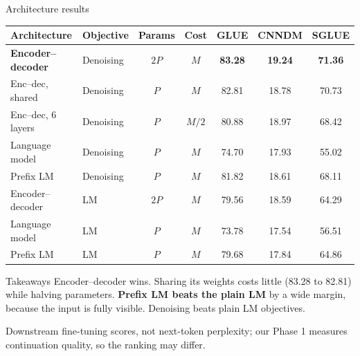 \documentclass[aspectratio=169,11pt]{beamer}
\begin{document}
\begin{frame}{Architecture results}
  \centering
  \footnotesize
      \begin{tabular}{@{}llccccc@{}}
        \toprule
        Architecture & Objective & Params & Cost & GLUE & CNNDM & SGLUE\\
        \midrule
        \textbf{Encoder--decoder} & Denoising & $2P$ & $M$ & \textbf{83.28} & \textbf{19.24} & \textbf{71.36}\\
        Enc--dec, shared & Denoising & $P$ & $M$ & 82.81 & 18.78 & 70.73\\
        Enc--dec, 6 layers & Denoising & $P$ & $M/2$ & 80.88 & 18.97 & 68.42\\
        Language model & Denoising & $P$ & $M$ & 74.70 & 17.93 & 55.02\\
        Prefix LM & Denoising & $P$ & $M$ & 81.82 & 18.61 & 68.11\\
        \midrule
        Encoder--decoder & LM & $2P$ & $M$ & 79.56 & 18.59 & 64.29\\
        Language model & LM & $P$ & $M$ & 73.78 & 17.54 & 56.51\\
        Prefix LM & LM & $P$ & $M$ & 79.68 & 17.84 & 64.86\\
        \bottomrule
      \end{tabular}
  \vspace{2mm}
  \begin{exampleblock}{Takeaways}
    \small
    Encoder--decoder wins. Sharing its weights costs little (83.28 to 82.81) while halving parameters.
    \textbf{Prefix LM beats the plain LM} by a wide margin, because the input is fully visible. Denoising beats plain LM objectives.
  \end{exampleblock}
  {\scriptsize Downstream fine-tuning scores, not next-token perplexity; our Phase 1 measures continuation quality, so the ranking may differ.}
\end{frame}
\end{document}
